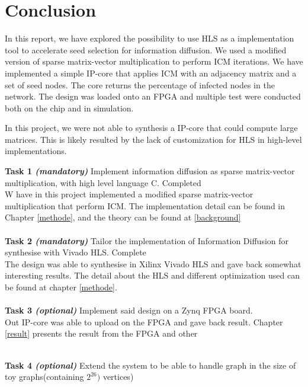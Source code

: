 \chapter{Conclusion}
In this report, we have explored the possibility to use HLS as a implementation tool to accelerate seed selection for information diffusion. We used a modified version of sparse matrix-vector multiplication to perform ICM iterations. We have implemented a simple IP-core that applies ICM with an adjacency matrix and a set of seed nodes. The core returns the percentage of infected nodes in the network. The design was loaded onto an FPGA and multiple test were conducted both on the chip and in simulation.

 In this project, we were not able to synthesis a IP-core that could compute large matrices. This is likely resulted by the lack of customization for HLS in high-level implementations. 
 

\textbf{Task 1 \textit{(mandatory)}} Implement information diffusion as sparse matrix-vector multiplication, with high level language C. Completed
\\

W have in this project implemented a modified sparse matrix-vector multiplication that perform ICM. The implementation detail can be found in Chapter \ref{methode}, and the theory can be found at \ref{background}  \\ \hfil \\ \hfil
\textbf{Task 2 \textit{(mandatory)}} Tailor the implementation of Information Diffusion for synthesise with Vivado HLS. Complete \\

The design was able to synthesise in Xilinx Vivado HLS and gave back somewhat interesting results. The detail about the HLS and different optimization used can be found at chapter \ref{methode}.  \\ \hfil \\ \hfil
\textbf{Task 3 \textit{(optional)}} Implement said design on a  Zynq FPGA board.\\

Out IP-core was able to upload on the FPGA and gave back result. Chapter \ref{result} presents the result from the FPGA and other 
 \\ \hfil \\ \hfil
 
\textbf{Task 4 \textit{(optional)}} Extend the system to be able to handle graph in the size of toy graphs(containing $2^{26})$ vertices) \\ \hfil \\ \hfil

